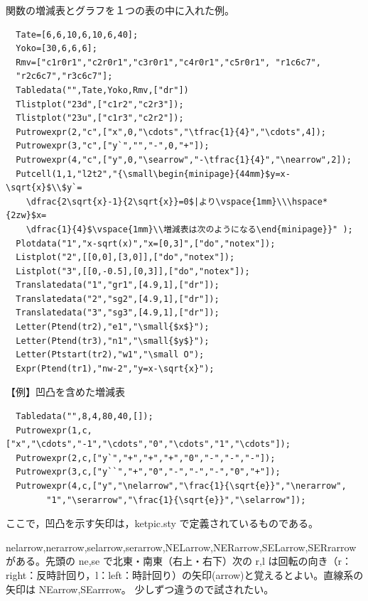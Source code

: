 \documentclass[papersize,a4paper,12pt,uplatex]{jsarticle}
\begin{document}
\begin{description}
\begin{description}
  関数の増減表とグラフを１つの表の中に入れた例。
\begin{verbatim}
  Tate=[6,6,10,6,10,6,40];
  Yoko=[30,6,6,6];
  Rmv=["c1r0r1","c2r0r1","c3r0r1","c4r0r1","c5r0r1", "r1c6c7",
  "r2c6c7","r3c6c7"]; 
  Tabledata("",Tate,Yoko,Rmv,["dr"])
  Tlistplot("23d",["c1r2","c2r3"]);
  Tlistplot("23u",["c1r3","c2r2"]);
  Putrowexpr(2,"c",["x",0,"\cdots","\tfrac{1}{4}","\cdots",4]);
  Putrowexpr(3,"c",["y`","","-",0,"+"]);
  Putrowexpr(4,"c",["y",0,"\searrow","-\tfrac{1}{4}","\nearrow",2]);
  Putcell(1,1,"l2t2","{\small\begin{minipage}{44mm}$y=x-\sqrt{x}$\\$y`=
    \dfrac{2\sqrt{x}-1}{2\sqrt{x}}=0$|より\vspace{1mm}\\\hspace*{2zw}$x=
    \dfrac{1}{4}$\vspace{1mm}\\増減表は次のようになる\end{minipage}}" );
  Plotdata("1","x-sqrt(x)","x=[0,3]",["do","notex"]);
  Listplot("2",[[0,0],[3,0]],["do","notex"]);
  Listplot("3",[[0,-0.5],[0,3]],["do","notex"]);
  Translatedata("1","gr1",[4.9,1],["dr"]);
  Translatedata("2","sg2",[4.9,1],["dr"]);
  Translatedata("3","sg3",[4.9,1],["dr"]);
  Letter(Ptend(tr2),"e1","\small{$x$}");
  Letter(Ptend(tr3),"n1","\small{$y$}");
  Letter(Ptstart(tr2),"w1","\small O");
  Expr(Ptend(tr1),"nw-2","y=x-\sqrt{x}");
\end{verbatim}
\begin{center}  \end{center}
              
\vspace{\baselineskip}
  【例】凹凸を含めた増減表
\begin{verbatim}
  Tabledata("",8,4,80,40,[]);
  Putrowexpr(1,c,["x","\cdots","-1","\cdots","0","\cdots","1","\cdots"]);
  Putrowexpr(2,c,["y`","+","+","+","0","-","-","-"]);
  Putrowexpr(3,c,["y``","+","0","-","-","-","0","+"]);
  Putrowexpr(4,c,["y","\nelarrow","\frac{1}{\sqrt{e}}","\nerarrow",
        "1","\serarrow","\frac{1}{\sqrt{e}}","\selarrow"]);
\end{verbatim}
\begin{center}  \end{center}
ここで，凹凸を示す矢印は，ketpic.sty で定義されているものである。

nelarrow,nerarrow,selarrow,serarrow,NELarrow,NERarrow,SELarrow,SERrarrow がある。先頭の ne,se で北東・南東（右上・右下）次の r,l は回転の向き（r：right：反時計回り，l：left：時計回り）の矢印(arrow)と覚えるとよい。直線系の矢印は NEarrow,SEarrrow。 少しずつ違うので試されたい。


\end{description}
\end{description}
\end{document}
